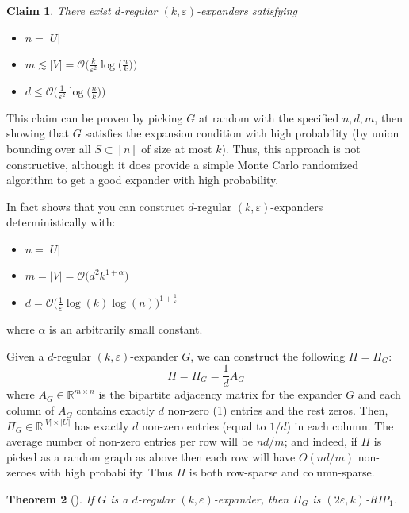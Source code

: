 \documentclass[11pt]{article}
\newtheorem{theorem}{Theorem}
\newtheorem{claim}[theorem]{Claim}
\begin{document}
\begin{claim}
	There exist $d$-regular $(k,\varepsilon)$-expanders satisfying
	\begin{itemize}
	\item 	$n = |U|$
	\item		$m \lesssim |V| = \mathcal{O}\bigl( \frac{k}{\varepsilon^2} \log\bigl( \frac{n}{k} \bigr)  \bigr)$	
	\item		$d \le \mathcal{O}\bigl(  \frac{1}{\varepsilon^2} \log \bigl(  \frac{n}{k} \bigr)   \bigr)$
	\end{itemize}
\end{claim}

This claim can be proven by picking $G$ at random with the specified $n, d, m$, then showing that $G$ satisfies the expansion condition with high probability (by union bounding over all $S\subset[n]$ of size at most $k$). Thus, this approach is not constructive, although it does provide a simple Monte Carlo randomized algorithm to get a good expander with high probability. 

In fact \cite{DBLP:conf/coco/GuruswamiUV07} shows that you can construct $d$-regular $(k,\varepsilon)$-expanders deterministically with:

\begin{itemize}
	\item 	$n = |U|$
	\item		$m = |V| = \mathcal{O}\bigl( d^2 k^{1+ \alpha}  \bigr)$	
	\item		$d = \mathcal{O}\bigl(  \frac{1}{\varepsilon} \log(k) \log(n)   \bigr)^{1 + \frac{1}{\varepsilon}}$
\end{itemize}
where $\alpha$ is an arbitrarily small constant.

Given a $d$-regular $(k,\varepsilon)$-expander $G$, we can construct the following $\Pi = \Pi_G$:
\[
	\Pi = \Pi_G = \frac{1}{d} A_G
\]
where $A_G \in \mathbb{R}^{m \times n}$ is the bipartite adjacency matrix for the expander $G$ and each column of $A_G$ contains exactly $d$ non-zero (1) entries and the rest zeros. Then, $\Pi_G \in \mathbb{R}^{|V| \times |U|}$ has exactly $d$ non-zero entries (equal to $1/d$) in each column.
The average number of non-zero entries per row will be $nd/m$; and indeed, if $\Pi$ is picked as a random graph as above then each row will have $O(nd/m)$ non-zeroes with high probability. Thus $\Pi$ is both row-sparse and column-sparse.

\begin{theorem}[{\cite[Theorem 1]{BGI08}}]
	If $G$ is a $d$-regular $(k,\varepsilon)$-expander, then $\Pi_G$ is $(2\varepsilon, k)$-RIP$_1$.
\end{theorem}
\end{document}
